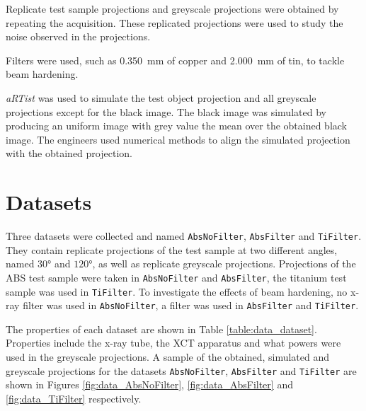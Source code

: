 Replicate test sample projections and greyscale projections were obtained by repeating the acquisition. These replicated projections were used to study the noise observed in the projections.

Filters were used, such as \SI{0.350}{\milli\metre} of copper and \SI{2.000}{\milli\metre} of tin, to tackle beam hardening.

\emph{aRTist} was used to simulate the test object projection and all greyscale projections except for the black image. The black image was simulated by producing an uniform image with grey value the mean over the obtained black image. The engineers used numerical methods to align the simulated projection with the obtained projection.

\section{Datasets}

Three datasets were collected and named \texttt{AbsNoFilter}, \texttt{AbsFilter} and \texttt{TiFilter}. They contain replicate projections of the test sample at two different angles, named $\ang{30}$ and $\ang{120}$, as well as replicate greyscale projections. Projections of the ABS test sample were taken in \texttt{AbsNoFilter} and \texttt{AbsFilter}, the titanium test sample was used in \texttt{TiFilter}. To investigate the effects of beam hardening, no x-ray filter was used in \texttt{AbsNoFilter}, a filter was used in \texttt{AbsFilter} and \texttt{TiFilter}.

The properties of each dataset are shown in Table \ref{table:data_dataset}. Properties include the x-ray tube, the XCT apparatus and what powers were used in the greyscale projections. A sample of the obtained, simulated and greyscale projections for the datasets \texttt{AbsNoFilter}, \texttt{AbsFilter} and \texttt{TiFilter} are shown in Figures \ref{fig:data_AbsNoFilter}, \ref{fig:data_AbsFilter} and \ref{fig:data_TiFilter} respectively.

